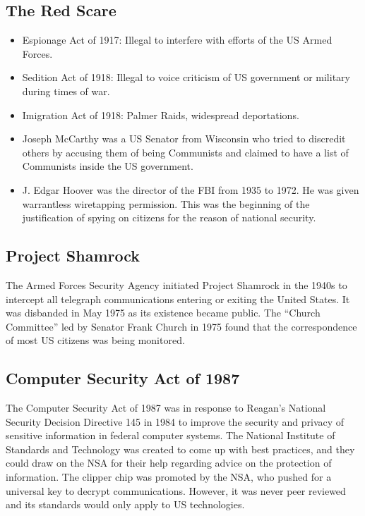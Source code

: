 \documentclass[letterpaper, 12pt]{article}
\begin{document}
\subsection*{The Red Scare}
\begin{itemize}
  \item Espionage Act of 1917: Illegal to interfere with efforts of the US
    Armed Forces.
  \item Sedition Act of 1918: Illegal to voice criticism of US government or
    military during times of war.
  \item Imigration Act of 1918: Palmer Raids, widespread deportations.
  \item Joseph McCarthy was a US Senator from Wisconsin who tried to discredit
    others by accusing them of being Communists and claimed to have a list of
    Communists inside the US government.
  \item J. Edgar Hoover was the director of the FBI from 1935 to 1972. He was
    given warrantless wiretapping permission. This was the beginning of the
    justification of spying on citizens for the reason of national security.
\end{itemize}

\subsection*{Project Shamrock}
The Armed Forces Security Agency initiated Project Shamrock in the 1940s to
intercept all telegraph communications entering or exiting the United States.
It was disbanded in May 1975 as its existence became public. The
``Church Committee'' led by Senator Frank Church in 1975 found that
the correspondence of most US citizens was being monitored.

\subsection*{Computer Security Act of 1987}
The Computer Security Act of 1987 was in response to Reagan's National Security
Decision Directive 145 in 1984 to improve the security and privacy of sensitive
information in federal computer systems. The National Institute of Standards
and Technology was created to come up with best practices, and they could draw
on the NSA for their help regarding advice on the protection of information.
The clipper chip was promoted by the NSA, who pushed for a universal key to
decrypt communications. However, it was never peer reviewed and its standards
would only apply to US technologies.
\end{document}
